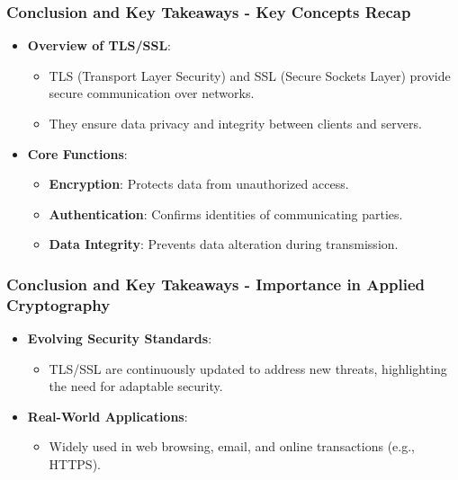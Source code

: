 \documentclass{beamer}
\begin{document}
\begin{frame}[fragile]
    \frametitle{Conclusion and Key Takeaways - Key Concepts Recap}
    \begin{itemize}
        \item \textbf{Overview of TLS/SSL}:
        \begin{itemize}
            \item TLS (Transport Layer Security) and SSL (Secure Sockets Layer) provide secure communication over networks.
            \item They ensure data privacy and integrity between clients and servers.
        \end{itemize}
        \item \textbf{Core Functions}:
        \begin{itemize}
            \item \textbf{Encryption}: Protects data from unauthorized access.
            \item \textbf{Authentication}: Confirms identities of communicating parties.
            \item \textbf{Data Integrity}: Prevents data alteration during transmission.
        \end{itemize}
    \end{itemize}
\end{frame}

\begin{frame}[fragile]
    \frametitle{Conclusion and Key Takeaways - Importance in Applied Cryptography}
    \begin{itemize}
        \item \textbf{Evolving Security Standards}: 
        \begin{itemize}
            \item TLS/SSL are continuously updated to address new threats, highlighting the need for adaptable security.
        \end{itemize}
        \item \textbf{Real-World Applications}:
        \begin{itemize}
            \item Widely used in web browsing, email, and online transactions (e.g., HTTPS).
        \end{itemize}
    \end{itemize}
\end{frame}
\end{document}
